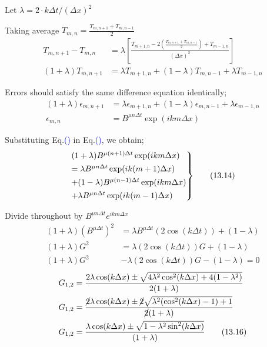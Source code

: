 \documentclass[fleqn,10pt]{SelfArx} %
\newcommand{\myeqref}[1]{Eq.\textcolor{blue}{\textup{(\getrefnumber{#1})}}}
\begin{document}
Let $\lambda = 2 \cdot k\Delta t/(\Delta x)^2$

Taking average $T_{m,n} = \frac{T_{m,n+1} + T_{m,n-1}}{2}$
\begin{align*}
	T_{m,n+1} - T_{m,n} &= \lambda\left[\frac{T_{m+1,n} - 2\left(\frac{T_{m,n+1} + T_{m,n-1}}{2}\right) + T_{m-1,n}}{(\Delta x)^2}\right] \\
	(1+\lambda)T_{m,n+1} &= \lambda T_{m+1,n} + (1 - \lambda)T_{m,n-1} + \lambda T_{m-1,n} \tag{13.11} \label{eq:13.11}
\end{align*}

Errors should satisfy the same difference equation identically;
\begin{align*}
	(1+\lambda)\epsilon_{m,n+1} &= \lambda \epsilon_{m+1,n} + (1 - \lambda)\epsilon_{m,n-1} + \lambda \epsilon_{m-1,n} \tag{13.12} \label{eq:13.12} \\
	\epsilon_{m,n} &= B^{\mu n\Delta t}\exp(ikm\Delta x) \tag{13.13} \label{eq:13.13}
\end{align*}

Substituting \myeqref{eq:13.12} in \myeqref{eq:13.11}, we obtain;
\begin{align*}
	\begin{rcases}
		&(1 +\lambda)B^{\mu (n+1) \Delta t}\exp(ikm\Delta x) \\ &= \lambda B^{\mu n\Delta t}\exp(ik (m+1) \Delta x) \\ &+ (1 - \lambda)B^{\mu (n-1) \Delta t}\exp(ikm \Delta x) \\ &+ \lambda B^{\mu n \Delta t}\exp(ik (m-1) \Delta x)
	\end{rcases} & \tag{13.14} \label{eq:13.14}
\end{align*}

Divide throughout by $B^{\mu n \Delta t} e^{ikm\Delta x}$
\begin{align*}
	(1 +\lambda)\left(B^{\mu \Delta t}\right)^2  &= \lambda B^{\mu \Delta t} \left(2\cos(k\Delta t)\right) + (1-\lambda) \\
	(1 +\lambda)G^2  &= \lambda \left(2\cos(k\Delta t)\right)G + (1 - \lambda) \\
	(1 +\lambda)G^2  &- \lambda \left(2\cos(k\Delta t)\right)G - (1 - \lambda) = 0 \tag{13.15} \label{eq:13.15}
\end{align*}
\begin{align*}
	G_{1,2} &= \frac{2\lambda \cos(k\Delta x) \pm \sqrt{4\lambda^2\cos^2(k\Delta x)+4(1-\lambda^2)}}{2(1+\lambda)} \\
	G_{1,2} &= \frac{\cancel{2}\lambda \cos(k\Delta x) \pm \cancel{2}\sqrt{\lambda^2(\cos^2(k\Delta x) - 1) + 1}}{\cancel{2}(1+\lambda)} \\
	G_{1,2} &= \frac{\lambda \cos(k\Delta x) \pm \sqrt{1 - \lambda^2\sin^2(k\Delta x)}}{(1+\lambda)} \tag{13.16} \label{eq:13.16}
\end{align*}
\end{document}
